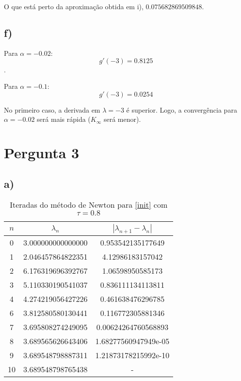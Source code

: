 \documentclass[a4paper, 18pt]{article}
\begin{document}
	\par
	O que está perto da aproximação obtida em i), $0.075682869509848$.

\subsection*{f)}
	\par
	Para $\alpha = -0.02$:
	$$g'(-3) = 0.8125$$.

	\par
	Para $\alpha = -0.1$:
	$$g'(-3) = 0.0254$$

	No primeiro caso, a derivada em $\lambda = -3$ é superior. Logo, a convergência para $\alpha = -0.02$ será mais rápida ($K_\infty$ será menor).


\section{Pergunta 3}
\subsection*{a)}
	\begin{table}[H]
		\setlength{\tabcolsep}{0.5cm} %
		\renewcommand{\arraystretch}{1.5} %
		\centering
		\caption{Iteradas do método de Newton para \eqref{init} com $\tau = 0.8$}
		\label{}
		\begin{tabular}{|c|c|c|}
			$n$ & $\lambda _n$ &  $| \lambda _{n+1} - \lambda _n |$ \\\hline
			0 & 3.000000000000000  & 0.953542135177649  \\
			1 & 2.046457864822351  & 4.12986183157042 \\
   			2 & 6.176319696392767  & 1.06598950585173 \\
   			3 & 5.110330190541037  & 0.836111134113811 \\
   			4 & 4.274219056427226  & 0.461638476296785 \\
   			6 & 3.812580580130441  & 0.116772305881346 \\
   			7 & 3.695808274249095  & 0.00624264760568893 \\
   			8 & 3.689565626643406  & 1.68277560947949e-05 \\
   			9 & 3.689548798887311  & 1.21873178215992e-10 \\
   			10 & 3.689548798765438 & - \\
		\end{tabular}
	\end{table}
\end{document}
